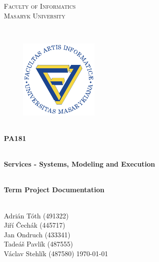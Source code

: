 \documentclass[11pt,a4paper]{article}
\begin{document}
\begin{titlepage}

    \begin{center}
        \vfill {%
            \Huge{%
                \textsc{%
                    Faculty of Informatics\\[3mm]%
                    Masaryk University%
                }%
            }%
        }%

        \hfill\\[15mm]

        \begin{figure}[!h]
            \centering
            \includegraphics[scale=3]{muni-fi-logo.pdf}
        \end{figure}

        \hfill\\[10mm]

        \Huge{
            \textbf{
                PA181
            }
        }

        \hfill\\[-10mm]

        \huge{
            \textbf{
                Services - Systems, Modeling and Execution
            }
        }

        \hfill\\[10mm]

        \LARGE{
            \textbf{
                Term Project Documentation
            }
        }
        \vfill

    \end{center}

        \Large{
            \hfill\\
            Adrián Tóth (491322)\\
            Jiří Čechák (445717)\\
            Jan Ondruch (433341)\\
            Tadeáš Pavlík (487555)\\
            Václav Stehlík (487580) \hfill \today
        }

\end{titlepage}
\end{document}
